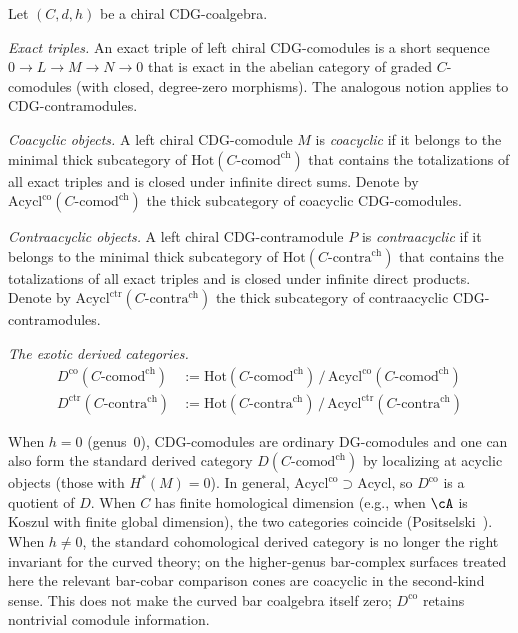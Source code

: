 \begin{definition}
\label{def:chiral-coderived}
Let $(C, d, h)$ be a chiral CDG-coalgebra.

\emph{Exact triples.}
An exact triple of left chiral CDG-comodules is a short sequence
$0 \to L \to M \to N \to 0$ that is exact in the abelian category
of graded $C$-comodules (with closed, degree-zero morphisms).
The analogous notion applies to CDG-contramodules.

\emph{Coacyclic objects.}
A left chiral CDG-comodule $M$ is \emph{coacyclic} if it belongs to
the minimal thick subcategory of $\mathrm{Hot}(C\text{-}\mathrm{comod}^{\mathrm{ch}})$
that contains the totalizations of all exact triples and is closed
under infinite direct sums. Denote by
$\mathrm{Acycl}^{\mathrm{co}}(C\text{-}\mathrm{comod}^{\mathrm{ch}})$
the thick subcategory of coacyclic CDG-comodules.

\emph{Contraacyclic objects.}
A left chiral CDG-contramodule $P$ is \emph{contraacyclic} if it
belongs to the minimal thick subcategory of
$\mathrm{Hot}(C\text{-}\mathrm{contra}^{\mathrm{ch}})$
that contains the totalizations of all exact triples and is closed
under infinite direct products. Denote by
$\mathrm{Acycl}^{\mathrm{ctr}}(C\text{-}\mathrm{contra}^{\mathrm{ch}})$
the thick subcategory of contraacyclic CDG-contramodules.

\emph{The exotic derived categories.}
\begin{align}
D^{\mathrm{co}}(C\text{-}\mathrm{comod}^{\mathrm{ch}})
&:= \mathrm{Hot}(C\text{-}\mathrm{comod}^{\mathrm{ch}})
\,/\, \mathrm{Acycl}^{\mathrm{co}}(C\text{-}\mathrm{comod}^{\mathrm{ch}})
\label{eq:chiral-coderived}\\
D^{\mathrm{ctr}}(C\text{-}\mathrm{contra}^{\mathrm{ch}})
&:= \mathrm{Hot}(C\text{-}\mathrm{contra}^{\mathrm{ch}})
\,/\, \mathrm{Acycl}^{\mathrm{ctr}}(C\text{-}\mathrm{contra}^{\mathrm{ch}})
\label{eq:chiral-contraderived}
\end{align}
\end{definition}

\begin{remark}
\label{rem:exotic-vs-ordinary}
When $h = 0$ (genus~$0$), CDG-comodules are ordinary DG-comodules
and one can also form the standard derived category
$D(C\text{-}\mathrm{comod}^{\mathrm{ch}})$
by localizing at acyclic objects (those with $H^*(M) = 0$). In general,
$\mathrm{Acycl}^{\mathrm{co}} \supset \mathrm{Acycl}$,
so $D^{\mathrm{co}}$ is a quotient of $D$. When $C$ has
finite homological dimension (e.g., when $\cA$ is Koszul with finite
global dimension), the two categories coincide
(Positselski~\cite[\S4.5]{Positselski11}). When $h \neq 0$, the standard
cohomological derived category is no longer the right invariant
for the curved theory; on the higher-genus bar-complex surfaces
treated here the relevant bar-cobar comparison cones are coacyclic in
the second-kind sense. This does not make the curved bar coalgebra
itself zero; $D^{\mathrm{co}}$ retains nontrivial comodule information.
\end{remark}

